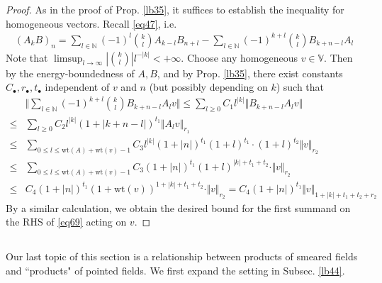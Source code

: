 \documentclass[12pt,b5paper,notitlepage]{article}
\theoremstyle{definition}
\theoremstyle{plain}
\newcommand{\blt}{\bullet}
\newcommand{\Vbb}{\mathbb V}
\newcommand{\Nbb}{\mathbb N}
\newcommand{\wt}{\mathrm{wt}}
\numberwithin{equation}{section}
\begin{document}
\begin{proof}
As in the proof of Prop. \ref{lb35}, it suffices to establish the inequality for homogeneous vectors. Recall \eqref{eq47}, i.e.
\begin{align*}
(A_kB)_n=\sum_{l\in\Nbb}(-1)^l{k\choose l}A_{k-l}B_{n+l}-\sum_{l\in\Nbb}(-1)^{k+l}{k\choose l}B_{k+n-l}A_l \tag{$\star$}\label{eq69}
\end{align*}
Note that $\limsup_{l\rightarrow\infty}|{k\choose l}|l^{-|k|}<+\infty$. Choose any homogeneous $v\in\Vbb$. Then by the energy-boundedness of $A,B$, and by Prop. \ref{lb35}, there exist constants $C_\blt,r_\blt,t_\blt$ independent of $v$ and $n$ (but possibly depending on $k$) such that
\begin{align*}
&\Big\Vert \sum_{l\in\Nbb}(-1)^{k+l}{k\choose l}B_{k+n-l}A_lv  \Big\Vert\leq \sum_{l\geq0}C_1l^{|k|}\big\Vert B_{k+n-l}A_lv\big\Vert\\
\leq&\sum_{l\geq0}C_2l^{|k|}(1+|k+n-l|)^{t_1}\big\Vert A_lv\Vert_{r_1}\\
\leq &\sum_{0\leq l\leq \wt(A)+\wt(v)-1}C_3l^{|k|}(1+|n|)^{t_1}(1+l)^{t_1} \cdot (1+l)^{t_2}\Vert v\Vert_{r_2}\\
\leq&\sum_{0\leq l\leq \wt(A)+\wt(v)-1}C_3(1+|n|)^{t_1}(1+l)^{|k|+t_1+t_2} \cdot \Vert v\Vert_{r_2}\\
\leq& C_4(1+|n|)^{t_1}(1+\wt(v))^{1+|k|+t_1+t_2} \cdot \Vert v\Vert_{r_2}=C_4(1+|n|)^{t_1}\Vert v\Vert_{1+|k|+t_1+t_2+r_2}
\end{align*}
By a similar calculation, we obtain the desired bound for the first summand on the RHS of \eqref{eq69} acting on $v$.
\end{proof}



\subsection{}


Our last topic of this section is a relationship between products of smeared fields and ``products" of pointed fields. We first expand the setting in Subsec. \ref{lb44}.
\end{document}
